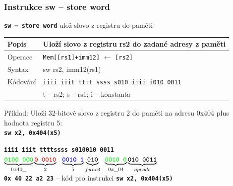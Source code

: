 \documentclass{beamer}
\begin{document}
\begin{frame}
\frametitle{Instrukce sw -- store word}

\textbf{\texttt{sw -- store word}} ulož slovo z registru do paměti

\bigskip

\begin{tabular}{|l|l|}\hline
Popis & Uloží slovo z registru rs2 do zadané adresy z paměti \\ \hline
Operace & \texttt{Mem[[rs1]+imm12]} $\leftarrow$ \texttt{[rs2]} \\ \hline
Syntax & sw rs2, imm12(rs1) \\ \hline
Kódování & \texttt{iiii iiit tttt ssss s010 iiii i010 0011} \\ 
 & t -- rs2; s -- rs1; i -- konstanta \\ \hline
\end{tabular}

\bigskip

Příklad: Uloží 32-bitové slovo z registru 2 do paměti na adresu 0x404 plus hodnota registru 5:\\
\textbf{\texttt{sw x2, 0x404(x5)}}

\textbf{\texttt{{\color{green}iiii iii}\hspace{0.08cm}\color{red}t tttt}}\phantom{x}\hspace{0.13cm}\textbf{\texttt{\color{blue}ssss s}}\hspace{0.1cm}\textbf{\texttt{010\hspace{0.05cm}010 0011}}\\
$\underbrace{\textbf{\texttt{\color{green}0100 000}}}_{0x40\_}
\underbrace{\textbf{\texttt{\color{red}0 0010}}}_{2}
\texttt{ }\underbrace{\textbf{\texttt{\color{blue}0010 1}}}_{5}
\underbrace{\textbf{\texttt{010}}}_{func3}\phantom{i}\underbrace{\textbf{\texttt{\color{green}0010 0}}}_{0x \_04}
\underbrace{\textbf{\texttt{010 0011}}}_{opcode}$\\

\textbf{\texttt{0x 40 22 a2 23}} -- kód pro instrukci \textbf{\texttt{sw x2, 0x404(x5)}}

\end{frame}
\end{document}
